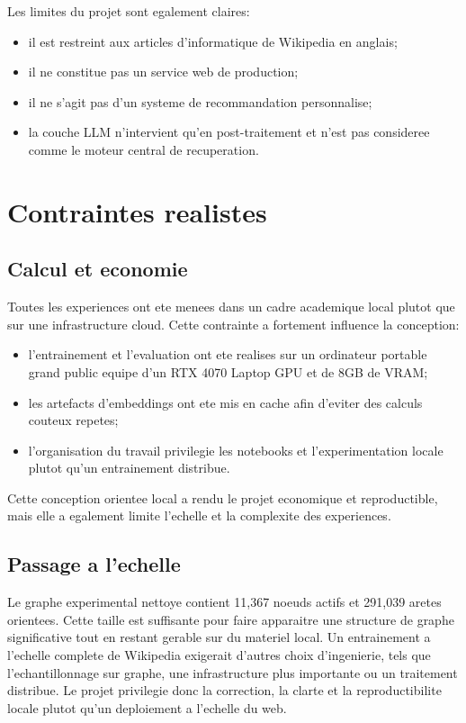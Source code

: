 Les limites du projet sont egalement claires:
\begin{itemize}
    \item il est restreint aux articles d'informatique de Wikipedia en anglais;
    \item il ne constitue pas un service web de production;
    \item il ne s'agit pas d'un systeme de recommandation personnalise;
    \item la couche LLM n'intervient qu'en post-traitement et n'est pas
    consideree comme le moteur central de recuperation.
\end{itemize}

\section{Contraintes realistes}

\subsection{Calcul et economie}

Toutes les experiences ont ete menees dans un cadre academique local plutot que
sur une infrastructure cloud. Cette contrainte a fortement influence la
conception:
\begin{itemize}
    \item l'entrainement et l'evaluation ont ete realises sur un ordinateur
    portable grand public equipe d'un RTX 4070 Laptop GPU et de 8GB de VRAM;
    \item les artefacts d'embeddings ont ete mis en cache afin d'eviter des
    calculs couteux repetes;
    \item l'organisation du travail privilegie les notebooks et
    l'experimentation locale plutot qu'un entrainement distribue.
\end{itemize}

Cette conception orientee local a rendu le projet economique et reproductible,
mais elle a egalement limite l'echelle et la complexite des experiences.

\subsection{Passage a l'echelle}

Le graphe experimental nettoye contient 11,367 noeuds actifs et 291,039 aretes
orientees. Cette taille est suffisante pour faire apparaitre une structure de
graphe significative tout en restant gerable sur du materiel local. Un
entrainement a l'echelle complete de Wikipedia exigerait d'autres choix
d'ingenierie, tels que l'echantillonnage sur graphe, une infrastructure plus
importante ou un traitement distribue. Le projet privilegie donc la correction,
la clarte et la reproductibilite locale plutot qu'un deploiement a l'echelle
du web.

